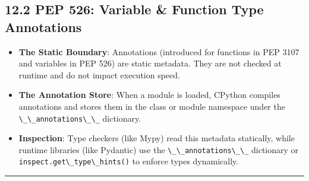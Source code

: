 \hypertarget{pep-526-variable-function-type-annotations}{%
\subsection{12.2 PEP 526: Variable \& Function Type
Annotations}\label{pep-526-variable-function-type-annotations}}

\begin{itemize}
\tightlist
\item
  \textbf{The Static Boundary}: Annotations (introduced for functions in
  PEP 3107 and variables in PEP 526) are static metadata. They are not
  checked at runtime and do not impact execution speed.
\item
  \textbf{The Annotation Store}: When a module is loaded, CPython
  compiles annotations and stores them in the class or module namespace
  under the \passthrough{\lstinline!\_\_annotations\_\_!} dictionary.
\item
  \textbf{Inspection}: Type checkers (like Mypy) read this metadata
  statically, while runtime libraries (like Pydantic) use the
  \passthrough{\lstinline!\_\_annotations\_\_!} dictionary or
  \passthrough{\lstinline!inspect.get\_type\_hints()!} to enforce types
  dynamically.
\end{itemize}

\begin{center}\rule{0.5\linewidth}{0.5pt}\end{center}
